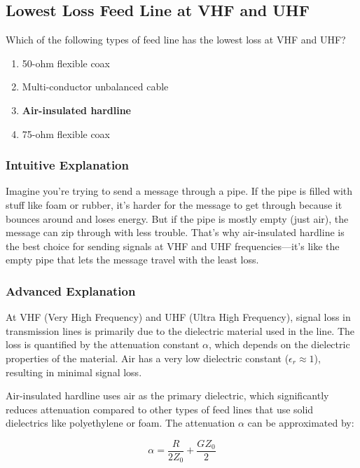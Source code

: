 \subsection{Lowest Loss Feed Line at VHF and UHF}
\label{T9B11}

\begin{tcolorbox}[colback=gray!10!white,colframe=black!75!black,title=T9B11]
Which of the following types of feed line has the lowest loss at VHF and UHF?
\begin{enumerate}[label=\Alph*)]
    \item 50-ohm flexible coax
    \item Multi-conductor unbalanced cable
    \item \textbf{Air-insulated hardline}
    \item 75-ohm flexible coax
\end{enumerate}
\end{tcolorbox}

\subsubsection{Intuitive Explanation}
Imagine you're trying to send a message through a pipe. If the pipe is filled with stuff like foam or rubber, it’s harder for the message to get through because it bounces around and loses energy. But if the pipe is mostly empty (just air), the message can zip through with less trouble. That’s why air-insulated hardline is the best choice for sending signals at VHF and UHF frequencies—it’s like the empty pipe that lets the message travel with the least loss.

\subsubsection{Advanced Explanation}
At VHF (Very High Frequency) and UHF (Ultra High Frequency), signal loss in transmission lines is primarily due to the dielectric material used in the line. The loss is quantified by the attenuation constant \(\alpha\), which depends on the dielectric properties of the material. Air has a very low dielectric constant (\(\epsilon_r \approx 1\)), resulting in minimal signal loss. 

Air-insulated hardline uses air as the primary dielectric, which significantly reduces attenuation compared to other types of feed lines that use solid dielectrics like polyethylene or foam. The attenuation \(\alpha\) can be approximated by:

\[
\alpha = \frac{R}{2Z_0} + \frac{G Z_0}{2}
\]

